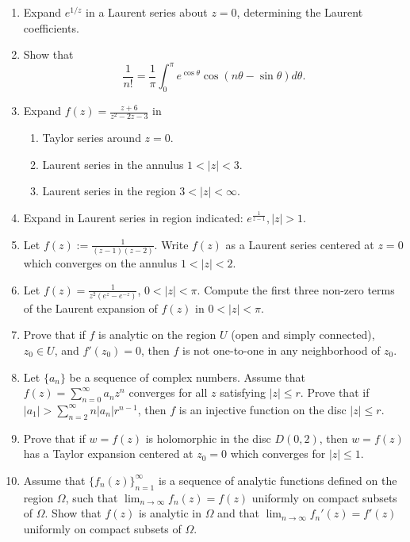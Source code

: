 \documentclass[a4paper,10pt]{article}
\begin{document}
\begin{enumerate}
 	\item Expand $e^{1/z}$ in a Laurent series about $z = 0$, determining the Laurent coefficients.
 	
 	\item Show that 
 	\[\frac{1}{n!} = \frac{1}{\pi} \int_{0}^{\pi} e^{\cos \theta} \cos(n \theta - \sin \theta) d\theta.\]
 	
 	\item Expand $f(z) = \frac{z + 6}{z^2 - 2z - 3}$ in
 	
 	\begin{enumerate}
 		\item Taylor series around $z = 0$.
 		
 		\item Laurent series in the annulus $1 < |z| < 3$.
 		
 		\item Laurent series in the region $3 < |z| < \infty$.
 	\end{enumerate}
 	
 	\item Expand in Laurent series in region indicated: $e^{\frac{1}{z - 1}}, |z| > 1$.
 	
 	\item Let $f(z):= \frac{1}{(z - 1)(z - 2)}$. Write $f(z)$ as a Laurent series centered at $z = 0$ which converges on the annulus $1 < |z| < 2$.
 	
 	\item Let $f(z) = \frac{1}{z^2 (e^z - e^{-z})}$, $0 < |z| < \pi$. Compute the first three non-zero terms of the Laurent expansion of $f(z)$ in $0 < |z| < \pi$.
 	
 	\item Prove that if $f$ is analytic on the region $U$ (open and simply connected), $z_0 \in U$, and $f'(z_0) = 0$, then $f$ is not one-to-one in any neighborhood of $z_0$.
 	
 	\item Let $\{a_n\}$ be a sequence of complex numbers. Assume that $f(z) = \sum_{n = 0}^{\infty} a_n z^n$ converges for all $z$ satisfying $|z| \leq r$. Prove that if $|a_1| > \sum_{n = 2}^{\infty} n |a_n| r^{n - 1}$, then $f$ is an injective function on the disc $|z| \leq r$.
 	
 	\item Prove that if $w = f(z)$ is holomorphic in the disc $D(0, 2)$, then $w = f(z)$ has a Taylor expansion centered at $z_0 = 0$ which converges for $|z| \leq 1$.
 	
 	\item Assume that $\{f_n(z)\}_{n = 1}^{\infty}$ is a sequence of analytic functions defined on the region $\Omega$, such that $\lim_{n \to \infty} f_n(z) = f(z)$ uniformly on compact subsets of $\Omega$. Show that $f(z)$ is analytic in $\Omega$ and that $\lim_{n \to \infty} f_n'(z) = f'(z)$ uniformly on compact subsets of $\Omega$.
 	

\end{enumerate}
\end{document}
